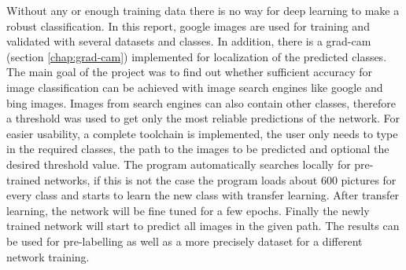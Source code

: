 \documentclass[../ImageClassifier.tex]{subfiles}
\begin{document}
    Without any or enough training data there is no way for deep learning to make a robust classification.
    In this report, google images are used for training and validated with several datasets and classes.
    In addition, there is a \ac{grad-cam} (section \ref{chap:grad-cam}) implemented for localization of the predicted classes.
    The main goal of the project was to find out whether sufficient accuracy for image classification can be achieved with image search engines like google and bing images.
    Images from search engines can also contain other classes, therefore a threshold was used to get only the most reliable predictions of the network.
    For easier usability, a complete toolchain is implemented, the user only needs to type in the required classes, the path to the images to be predicted and optional the desired threshold value.
    The program automatically searches locally for pre-trained networks, if this is not the case the program loads about 600 pictures for every class and starts to learn the new class with transfer learning.
    After transfer learning, the network will be fine tuned for a few epochs.
    Finally the newly trained network will start to predict all images in the given path.
    The results can be used for pre-labelling as well as a more precisely dataset for a different network training.
\end{document}
